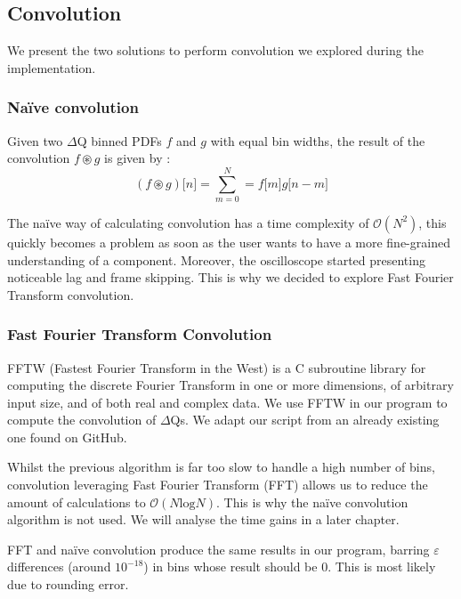     \subsection{Convolution} \label{convol}
    We present the two solutions to perform convolution we explored during the implementation.  
        \subsubsection{Naïve convolution}
        Given two $\Delta$Q binned PDFs $f$ and $g$ with equal bin widths, the result of the convolution $f \circledast g$ is given by \cite{conv}: 
        \begin{equation}
            (f \circledast g)\lbrack n \rbrack = \sum_{m = 0}^{N} = f\lbrack m \rbrack g \lbrack n - m \rbrack  
            \label{eq:discconv}
        \end{equation}

        The naïve way of calculating convolution has a time complexity of $\mathcal{O}(N^2)$, this quickly becomes a problem as soon as the user wants to have a more fine-grained understanding of a component. Moreover, the oscilloscope started presenting noticeable lag and frame skipping. This is why we decided to explore Fast Fourier Transform convolution. 
 
    \subsubsection{Fast Fourier Transform Convolution}
        FFTW (Fastest Fourier Transform in the West) is a C subroutine library \cite{fftw3} for computing the discrete Fourier Transform in one or more dimensions, of arbitrary input size, and of both real and complex data. We use FFTW in our program to compute the convolution of $\Delta$Qs. We adapt our script from an already existing one found on GitHub. \cite{fft}
    
    Whilst the previous algorithm is far too slow to handle a high number of bins, convolution leveraging Fast Fourier Transform (FFT) allows us to reduce the amount of calculations to $\mathcal{O}(N \text{log} N)$. This is why the naïve convolution algorithm is not used. We will analyse the time gains in a later chapter.
    
    FFT and naïve convolution produce the same results in our program, barring $\varepsilon$ differences (around $10^{-18}$) in bins whose result should be 0. This is most likely due to rounding error.
    
